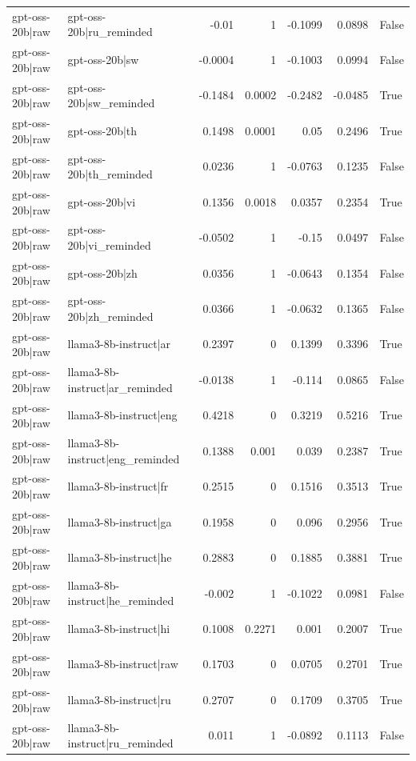 \begin{table}
\begin{tabular}{l l r r r r l}
gpt-oss-20b|raw & gpt-oss-20b|ru_reminded & -0.01 & 1 & -0.1099 & 0.0898 & False \\
gpt-oss-20b|raw & gpt-oss-20b|sw & -0.0004 & 1 & -0.1003 & 0.0994 & False \\
gpt-oss-20b|raw & gpt-oss-20b|sw_reminded & -0.1484 & 0.0002 & -0.2482 & -0.0485 & True \\
gpt-oss-20b|raw & gpt-oss-20b|th & 0.1498 & 0.0001 & 0.05 & 0.2496 & True \\
gpt-oss-20b|raw & gpt-oss-20b|th_reminded & 0.0236 & 1 & -0.0763 & 0.1235 & False \\
gpt-oss-20b|raw & gpt-oss-20b|vi & 0.1356 & 0.0018 & 0.0357 & 0.2354 & True \\
gpt-oss-20b|raw & gpt-oss-20b|vi_reminded & -0.0502 & 1 & -0.15 & 0.0497 & False \\
gpt-oss-20b|raw & gpt-oss-20b|zh & 0.0356 & 1 & -0.0643 & 0.1354 & False \\
gpt-oss-20b|raw & gpt-oss-20b|zh_reminded & 0.0366 & 1 & -0.0632 & 0.1365 & False \\
gpt-oss-20b|raw & llama3-8b-instruct|ar & 0.2397 & 0 & 0.1399 & 0.3396 & True \\
gpt-oss-20b|raw & llama3-8b-instruct|ar_reminded & -0.0138 & 1 & -0.114 & 0.0865 & False \\
gpt-oss-20b|raw & llama3-8b-instruct|eng & 0.4218 & 0 & 0.3219 & 0.5216 & True \\
gpt-oss-20b|raw & llama3-8b-instruct|eng_reminded & 0.1388 & 0.001 & 0.039 & 0.2387 & True \\
gpt-oss-20b|raw & llama3-8b-instruct|fr & 0.2515 & 0 & 0.1516 & 0.3513 & True \\
gpt-oss-20b|raw & llama3-8b-instruct|ga & 0.1958 & 0 & 0.096 & 0.2956 & True \\
gpt-oss-20b|raw & llama3-8b-instruct|he & 0.2883 & 0 & 0.1885 & 0.3881 & True \\
gpt-oss-20b|raw & llama3-8b-instruct|he_reminded & -0.002 & 1 & -0.1022 & 0.0981 & False \\
gpt-oss-20b|raw & llama3-8b-instruct|hi & 0.1008 & 0.2271 & 0.001 & 0.2007 & True \\
gpt-oss-20b|raw & llama3-8b-instruct|raw & 0.1703 & 0 & 0.0705 & 0.2701 & True \\
gpt-oss-20b|raw & llama3-8b-instruct|ru & 0.2707 & 0 & 0.1709 & 0.3705 & True \\
gpt-oss-20b|raw & llama3-8b-instruct|ru_reminded & 0.011 & 1 & -0.0892 & 0.1113 & False \\

\end{tabular}
\end{table}
